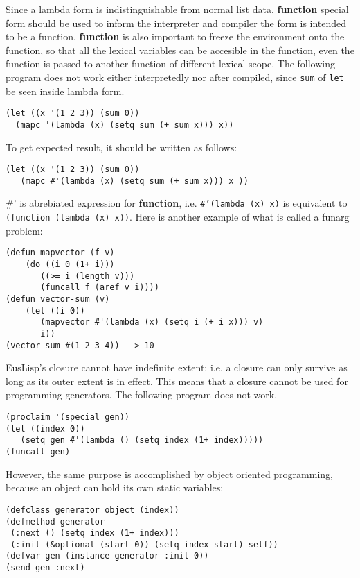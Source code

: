 Since a lambda form is indistinguishable from normal list data,
{\bf function} special form should be used to inform the interpreter and
compiler the form is intended to be a function.
{\bf function} is also important to freeze the environment onto the function,
so that all the lexical variables can be accesible in the function,
even the function is passed to another function of different lexical scope.
The following program does not work either interpretedly nor after compiled,
since {\tt sum} of {\tt let} be seen inside lambda form.

\begin{verbatim}
(let ((x '(1 2 3)) (sum 0))
  (mapc '(lambda (x) (setq sum (+ sum x))) x))
\end{verbatim}

To get expected result, it should be written as follows:
\begin{verbatim}
(let ((x '(1 2 3)) (sum 0))
   (mapc #'(lambda (x) (setq sum (+ sum x))) x ))
\end{verbatim}

\#' is abrebiated expression for {\bf function},
i.e. {\tt \#'(lambda (x) x)} is equivalent to
{\tt (function (lambda (x) x))}.
Here is another example of what is called a funarg problem:

\begin{verbatim}
(defun mapvector (f v)
    (do ((i 0 (1+ i)))
       ((>= i (length v)))
       (funcall f (aref v i))))
(defun vector-sum (v)
    (let ((i 0))
       (mapvector #'(lambda (x) (setq i (+ i x))) v)
       i))
(vector-sum #(1 2 3 4)) --> 10 
\end{verbatim}

EusLisp's closure cannot have indefinite extent:
i.e. a closure can only survive as long as its outer extent is in effect.
This means that a closure cannot be used for programming generators.
The following program does not work.

\begin{verbatim}
(proclaim '(special gen))
(let ((index 0))
   (setq gen #'(lambda () (setq index (1+ index)))))
(funcall gen)
\end{verbatim}

However, the same purpose is accomplished by object oriented programming,
because an object can hold its own static variables:
\begin{verbatim}
(defclass generator object (index))
(defmethod generator
 (:next () (setq index (1+ index)))
 (:init (&optional (start 0)) (setq index start) self))
(defvar gen (instance generator :init 0))
(send gen :next)
\end{verbatim}
\newpage
